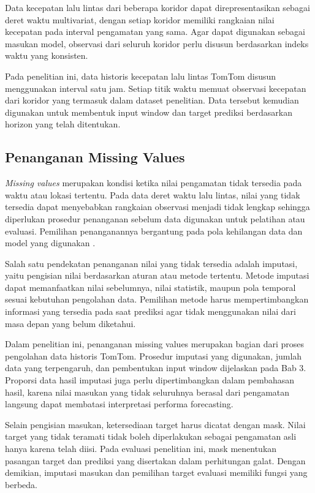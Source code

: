 Data kecepatan lalu lintas dari beberapa koridor dapat direpresentasikan sebagai deret waktu multivariat, dengan setiap koridor memiliki rangkaian nilai kecepatan pada interval pengamatan yang sama. Agar dapat digunakan sebagai masukan model, observasi dari seluruh koridor perlu disusun berdasarkan indeks waktu yang konsisten.

Pada penelitian ini, data historis kecepatan lalu lintas TomTom disusun menggunakan interval satu jam. Setiap titik waktu memuat observasi kecepatan dari koridor yang termasuk dalam dataset penelitian. Data tersebut kemudian digunakan untuk membentuk input window dan target prediksi berdasarkan horizon yang telah ditentukan.

\subsection{Penanganan Missing Values}

\textit{Missing values} merupakan kondisi ketika nilai pengamatan tidak tersedia pada waktu atau lokasi tertentu. Pada data deret waktu lalu lintas, nilai yang tidak tersedia dapat menyebabkan rangkaian observasi menjadi tidak lengkap sehingga diperlukan prosedur penanganan sebelum data digunakan untuk pelatihan atau evaluasi. Pemilihan penanganannya bergantung pada pola kehilangan data dan model yang digunakan \cite{hyndman2021fpp3}.

Salah satu pendekatan penanganan nilai yang tidak tersedia adalah imputasi, yaitu pengisian nilai berdasarkan aturan atau metode tertentu. Metode imputasi dapat memanfaatkan nilai sebelumnya, nilai statistik, maupun pola temporal sesuai kebutuhan pengolahan data. Pemilihan metode harus mempertimbangkan informasi yang tersedia pada saat prediksi agar tidak menggunakan nilai dari masa depan yang belum diketahui.

Dalam penelitian ini, penanganan missing values merupakan bagian dari proses pengolahan data historis TomTom. Prosedur imputasi yang digunakan, jumlah data yang terpengaruh, dan pembentukan input window dijelaskan pada Bab 3. Proporsi data hasil imputasi juga perlu dipertimbangkan dalam pembahasan hasil, karena nilai masukan yang tidak seluruhnya berasal dari pengamatan langsung dapat membatasi interpretasi performa forecasting.

Selain pengisian masukan, ketersediaan target harus dicatat dengan mask. Nilai target yang tidak teramati tidak boleh diperlakukan sebagai pengamatan asli hanya karena telah diisi. Pada evaluasi penelitian ini, mask menentukan pasangan target dan prediksi yang disertakan dalam perhitungan galat. Dengan demikian, imputasi masukan dan pemilihan target evaluasi memiliki fungsi yang berbeda.

